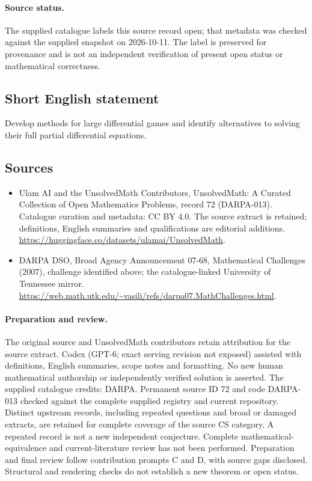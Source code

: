\documentclass[11pt]{article}
\begin{document}
\paragraph{Source status.}
The supplied catalogue labels this source record open; that metadata was checked against the supplied snapshot on 2026-10-11. The label is preserved for provenance and is not an independent verification of present open status or mathematical correctness.
\subsection{Short English statement}
Develop methods for large differential games and identify alternatives to solving their full partial differential equations.
\subsection{Sources}
\begin{itemize}
\item[\hypertarget{source:72:1}{S1}] Ulam AI and the UnsolvedMath Contributors, UnsolvedMath: A Curated Collection of Open Mathematics Problems, record 72 (DARPA-013). Catalogue curation and metadata: CC BY 4.0. The source extract is retained; definitions, English summaries and qualifications are editorial additions.
\url{https://huggingface.co/datasets/ulamai/UnsolvedMath}.
\item[\hypertarget{source:72:2}{S2}] DARPA DSO, Broad Agency Announcement 07-68, Mathematical Challenges (2007), challenge identified above; the catalogue-linked University of Tennessee mirror.
\url{https://web.math.utk.edu/~vasili/refs/darpa07.MathChallenges.html}.
\end{itemize}
\paragraph{Preparation and review.}
The original source and UnsolvedMath contributors retain attribution for the source extract. Codex (GPT-6; exact serving revision not exposed) assisted with definitions, English summaries, scope notes and formatting. No new human mathematical authorship or independently verified solution is asserted. The supplied catalogue credits: DARPA. Permanent source ID 72 and code DARPA-013 checked against the complete supplied registry and current repository. Distinct upstream records, including repeated questions and broad or damaged extracts, are retained for complete coverage of the source CS category. A repeated record is not a new independent conjecture. Complete mathematical-equivalence and current-literature review has not been performed. Preparation and final review follow contribution prompts C and D, with source gaps disclosed. Structural and rendering checks do not establish a new theorem or open status.
\label{end:72}
\end{document}
